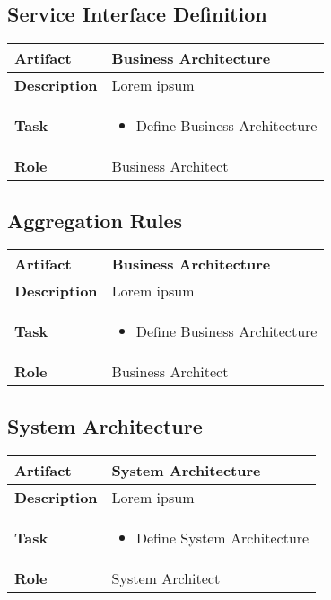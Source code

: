 \subsection{Service Interface Definition}
\begin{minipage}{\textwidth}
 \label{table:ch6_Artifact_Service_Interface_Definition}
\begin{tabular}
	{|m{2cm}|m{10cm}|} \hline \bfseries Artifact & Business Architecture\\
	\hline \bfseries Description & Lorem ipsum\\
	\hline \bfseries Task & 
	\begin{itemize}
		\item Define Business Architecture 
	\end{itemize}
	\\
	\hline \bfseries Role & Business Architect\\
	\hline 
\end{tabular}
\end{minipage}

\subsection{Aggregation Rules}
\begin{minipage}{\textwidth}
 \label{table:ch6_Artifact_Aggregation_Rules}
\begin{tabular}
	{|m{2cm}|m{10cm}|} \hline \bfseries Artifact & Business Architecture\\
	\hline \bfseries Description & Lorem ipsum\\
	\hline \bfseries Task & 
	\begin{itemize}
		\item Define Business Architecture 
	\end{itemize}
	\\
	\hline \bfseries Role & Business Architect\\
	\hline 
\end{tabular}
\end{minipage}

\subsection{System Architecture}
\begin{minipage}{\textwidth}
 \label{table:ch6_Artifact_System_Architecture}
\begin{tabular}
	{|m{2cm}|m{10cm}|} \hline \bfseries Artifact & System Architecture\\
	\hline \bfseries Description & Lorem ipsum\\
	\hline \bfseries Task & 
	\begin{itemize}
		\item Define System Architecture 
	\end{itemize}
	\\
	\hline \bfseries Role & System Architect\\
	\hline 
\end{tabular}
\end{minipage}

